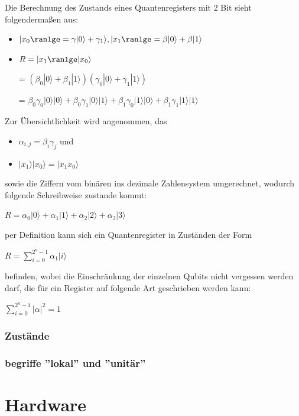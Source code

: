 Die Berechnung des Zustands eines Quantenregisters mit 2 Bit sieht folgendermaßen aus:
\begin{itemize}
    \item $|x_0\ranlge = \gamma|0\rangle + \gamma_1\rangle, |x_1\ranlge = \beta|0\rangle + \beta|1\rangle$
    \item $R = |x_1\ranlge|x_0\rangle$
	\item[=] $(\beta_0|0\rangle+\beta_1|1\rangle)(\gamma_0|0\rangle+\gamma_1|1\rangle)$
	\item[=] $\beta_0\gamma_0|0\rangle|0\rangle+\beta_0\gamma_1|0\rangle|1\rangle+\beta_1\gamma_0|1\rangle|0\rangle+\beta_1\gamma_1|1\rangle|1\rangle$
\end{itemize}

Zur Übersichtlichkeit wird angenommen, das
\begin{itemize}
	\item $\alpha_{i,j} = \beta_i\gamma_j$ und
	\item $|x_1\rangle|x_0\rangle = |x_1 x_0\rangle$
\end{itemize}
sowie die Ziffern vom binären ins dezimale Zahlensystem umgerechnet, wodurch folgende Schreibweise zustande kommt:

$R = \alpha_0|0\rangle+\alpha_1|1\rangle+\alpha_2|2\rangle+\alpha_3|3\rangle$

per Definition kann sich ein Quantenregister in Zuständen der Form

$R = \displaystyle\sum_{i=0}^{2^n-1} \alpha_1|i\rangle$

befinden, wobei die Einschränkung der einzelnen Qubits nicht vergessen werden darf, die für ein Register auf folgende Art geschrieben werden kann:

$\displaystyle\sum_{i=0}^{2^n-1}  |\alpha|^2 = 1$

\subsubsection{Zustände}
\label{sec:zustande}





\subsubsection{begriffe ''lokal'' und ''unitär''}
\label{sec:lokal_unitar}





\section{Hardware}
\label{sec:hardware}

